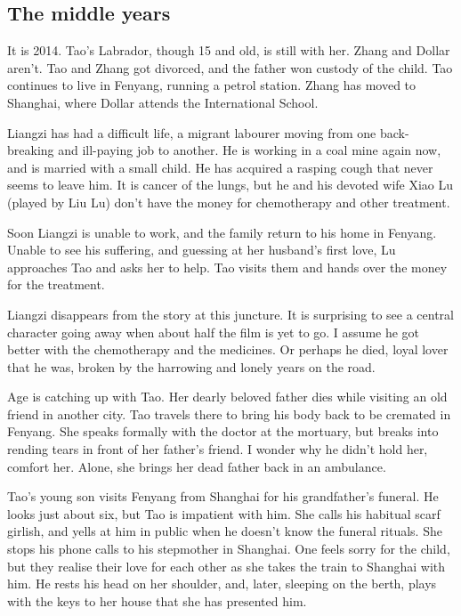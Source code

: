 \documentclass{article}
\begin{document}
\subsection{The middle years}
\label{sec:m1ubz2fo}

It is 2014.  Tao's Labrador, though 15 and old, is still with her.
Zhang and Dollar aren't.  Tao and Zhang got divorced, and the father
won custody of the child.  Tao continues to live in Fenyang, running a
petrol station.  Zhang has moved to Shanghai, where Dollar attends the
International School.

Liangzi has had a difficult life, a migrant labourer moving from one
back-breaking and ill-paying job to another.  He is working in a coal
mine again now, and is married with a small child.  He has acquired a
rasping cough that never seems to leave him.  It is cancer of the
lungs, but he and his devoted wife Xiao Lu (played by Liu Lu) don't
have the money for chemotherapy and other treatment.

Soon Liangzi is unable to work, and the family return to his home in
Fenyang.  Unable to see his suffering, and guessing at her husband's
first love, Lu approaches Tao and asks her to help.  Tao visits them
and hands over the money for the treatment.

Liangzi disappears from the story at this juncture.  It is surprising
to see a central character going away when about half the film is yet
to go.  I assume he got better with the chemotherapy and the
medicines.  Or perhaps he died, loyal lover that he was, broken by the
harrowing and lonely years on the road.

Age is catching up with Tao.  Her dearly beloved father dies while
visiting an old friend in another city.  Tao travels there to bring
his body back to be cremated in Fenyang.  She speaks formally with the
doctor at the mortuary, but breaks into rending tears in front of her
father's friend.  I wonder why he didn't hold her, comfort her.
Alone, she brings her dead father back in an ambulance.

Tao's young son visits Fenyang from Shanghai for his grandfather's
funeral.  He looks just about six, but Tao is impatient with him.  She
calls his habitual scarf girlish, and yells at him in public when he
doesn't know the funeral rituals.  She stops his phone calls to his
stepmother in Shanghai.  One feels sorry for the child, but they
realise their love for each other as she takes the train to Shanghai
with him.  He rests his head on her shoulder, and, later, sleeping on
the berth, plays with the keys to her house that she has presented
him.
\end{document}
